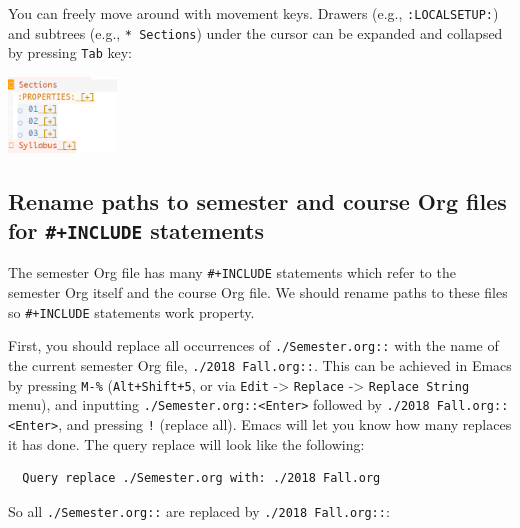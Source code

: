 \documentclass[10pt,article]{article}
\begin{document}
You can freely move around with movement keys. Drawers (e.g., \texttt{:LOCALSETUP:})
and subtrees (e.g., \texttt{* Sections}) under the cursor can be expanded and
collapsed by pressing \texttt{Tab} key:

\begin{center}
\includegraphics[height=2cm]{../../../Assets/Images/Org-Teaching/Quickstart_Org-Expand.png}
\end{center}

\subsection{Rename paths to semester and course Org files for \texttt{\#+INCLUDE} statements}
\label{sec:org19895a3}
The semester Org file has many \texttt{\#+INCLUDE} statements which refer to the
semester Org itself and the course Org file. We should rename paths to these
files so \texttt{\#+INCLUDE} statements work property.

First, you should replace all occurrences of \texttt{./Semester.org::} with the name
of the current semester Org file, \texttt{./2018 Fall.org::}. This can be achieved in
Emacs by pressing \texttt{M-\%} (\texttt{Alt+Shift+5}, or via \texttt{Edit} -> \texttt{Replace} -> \texttt{Replace
String} menu), and inputting \texttt{./Semester.org::<Enter>} followed by \texttt{./2018
Fall.org::<Enter>}, and pressing \texttt{!} (replace all). Emacs will let you know
how many replaces it has done. The query replace will look like the following:

\begin{verbatim}
  Query replace ./Semester.org with: ./2018 Fall.org
\end{verbatim}

So all \texttt{./Semester.org::} are replaced by \texttt{./2018 Fall.org::}:
\end{document}
